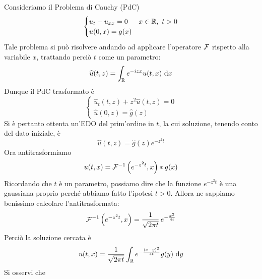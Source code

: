 Consideriamo il Problema di Cauchy (PdC)
\begin{equation*}
\begin{cases}
u_{t} - u_{xx} = 0&x\in\mathbb{R},\ t>0\\
u(0,x)=g(x)
\end{cases}
\end{equation*}
Tale problema si può risolvere andando ad applicare l'operatore $\mathcal{F}$ rispetto alla variabile $x$, trattando perciò $t$ come un parametro:
\begin{equation*}
\widehat{u}(t, z) = \int_{\mathbb{R}} e^{-izx} u(t, x) \  \mathrm{d} x
\end{equation*}
Dunque il PdC trasformato è
\begin{equation*}
\begin{cases}
\hat{u}_{t}(t,z) + z^2\hat{u}(t,z) = 0\\
\hat{u}(0,z)=\hat{g}(z)
\end{cases}
\end{equation*}
Si è pertanto ottenta un'EDO del prim'ordine in $t$, la cui soluzione, tenendo conto del dato iniziale, è
\begin{equation*}
\hat{u}(t, z) = \hat{g}(z) e^{- z^{2} t}
\end{equation*}
Ora antitrasformiamo
\begin{equation*}
u(t, x) = \mathcal{F}^{- 1}\left(e^{- z^{2} t}, x\right)*g(x)
\end{equation*}
Ricordando che $t$ è un parametro, possiamo dire che la funzione $e^{- z^{2} t}$ è una gaussiana proprio perché abbiamo fatto l'ipotesi $t>0$. Allora ne sappiamo benissimo calcolare l'antitrasformata:
\begin{equation*}
\mathcal{F}^{- 1}\left(e^{- z^{2} t}, x\right)=\frac{1}{\sqrt{2\pi t}}\,e^{-\frac{x^2}{4t}}
\end{equation*}
Perciò la soluzione cercata è
\begin{equation*}
u(t,x)=\frac{1}{\sqrt{2\pi t}}\int_{\mathbb{R}} e^{-\frac{(x-y)^2}{4t}}g(y)\  \mathrm{d} y
\end{equation*}
Si osservi che
